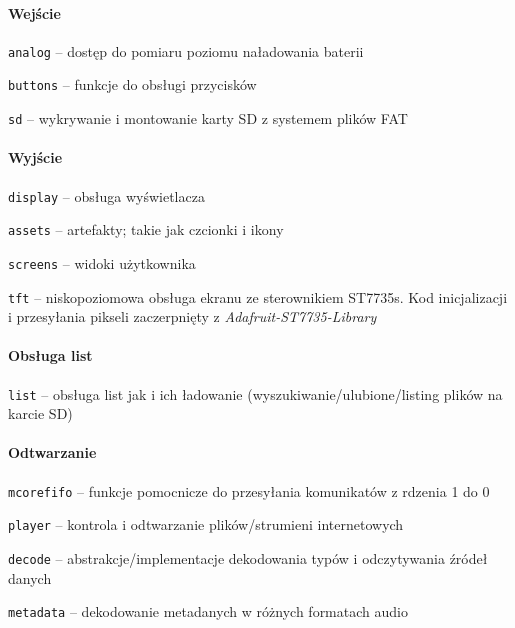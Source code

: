 \documentclass[polish]{aghengthesis}
\let\tempone\itemize
\let\temptwo\enditemize
\renewenvironment{itemize}{\tempone\setlength{\itemsep}{0cm}}{\temptwo}
\begin{document}
			\paragraph{Wejście}
				\begin{itemize}
					\item \lstinline|analog| -- dostęp do pomiaru poziomu naładowania baterii
					\item \lstinline|buttons| -- funkcje do obsługi przycisków
					\item \lstinline|sd| -- wykrywanie i montowanie karty SD z systemem plików FAT
				\end{itemize}
		
			\paragraph{Wyjście}
				\begin{itemize}
					\item \lstinline|display| -- obsługa wyświetlacza
					\begin{itemize}
						\item \lstinline|assets| -- artefakty; takie jak czcionki i ikony
						\item \lstinline|screens| -- widoki użytkownika
						\item \lstinline|tft| -- niskopoziomowa obsługa ekranu ze sterownikiem ST7735s. Kod inicjalizacji i przesyłania pikseli zaczerpnięty z \textit{Adafruit-ST7735-Library}\textsuperscript{\cite{adafruit_st7735}}
					\end{itemize}
				\end{itemize}
			
			\paragraph{Obsługa list}
				\begin{itemize}
					\item \lstinline|list| -- obsługa list jak i ich ładowanie (wyszukiwanie/ulubione/listing plików na karcie SD)
				\end{itemize}
			
			\paragraph{Odtwarzanie}
				\begin{itemize}
					\item \lstinline|mcorefifo| -- funkcje pomocnicze do przesyłania komunikatów z rdzenia 1 do 0
					\item \lstinline|player| -- kontrola i odtwarzanie plików/strumieni internetowych
					\begin{itemize}
						\item \lstinline|decode| -- abstrakcje/implementacje dekodowania typów i odczytywania źródeł danych
						\item \lstinline|metadata| -- dekodowanie metadanych w różnych formatach audio
					\end{itemize}
				\end{itemize}
		
\end{document}
